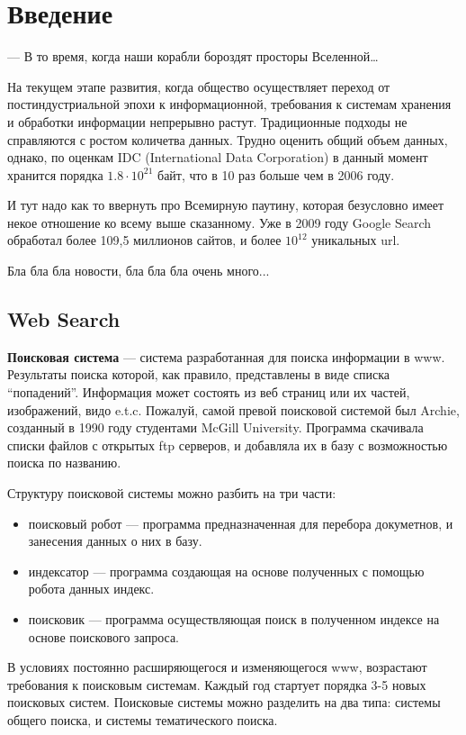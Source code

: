 \chapter{Введение}
\epigraph{— В то время, когда наши корабли бороздят просторы Вселенной…}{}
На текущем этапе развития, когда общество осуществляет переход от постиндустриальной эпохи к информационной, требования к системам хранения и обработки информации непрерывно растут. Традиционные подходы не справляются с ростом количетва данных. Трудно оценить общий объем данных, однако, по оценкам IDC (International Data Corporation) в данный момент хранится порядка $1.8\cdot10^{21}$ байт, что в 10 раз больше чем в 2006 году.

И тут надо как то ввернуть про Всемирную паутину, которая безусловно имеет некое отношение ко всему выше сказанному. Уже в 2009 году Google Search обработал более 109,5 миллионов сайтов, и более $10^{12}$ уникальных url.

Бла бла бла новости, бла бла бла очень много...

\section{Web Search}
\textbf{Поисковая система} --- система разработанная для поиска информации в www. Результаты поиска которой, как правило, представлены в виде списка ``попадений''. Информация может состоять из веб страниц или их частей, изображений, видо e.t.c. Пожалуй, самой превой поисковой системой был Archie, созданный в 1990 году студентами McGill University. Программа скачивала списки файлов с открытых ftp серверов, и добавляла их в базу с возможностью поиска по названию.

Структуру поисковой системы можно разбить на три части:
\begin{itemize}
 \item поисковый робот --- программа предназначенная для перебора докуметнов, и занесения данных о них в базу.
 \item индексатор --- программа создающая на основе полученных с помощью робота данных индекс.
 \item поисковик --- программа осуществляющая поиск в полученном индексе на основе поискового запроса.
\end{itemize}
 
В условиях постоянно расширяющегося и изменяющегося www, возрастают требования к поисковым системам. Каждый год стартует порядка 3-5 новых поисковых систем. Поисковые системы можно разделить на два типа: системы общего поиска, и системы тематического поиска.

